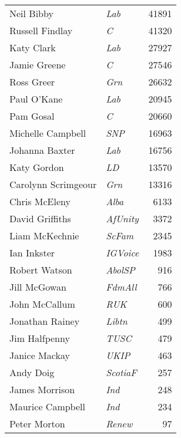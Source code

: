 {\footnotesize
\begin{tabular*}{\columnwidth}{@{\extracolsep{\fill}} p{} >{\itshape}l r @{\extracolsep{\fill}}}
	Neil Bibby & Lab & 41891\\%
	Russell Findlay & C & 41320\\%
	Katy Clark & Lab & 27927\\%
	Jamie Greene & C & 27546\\%
	Ross Greer & Grn & 26632\\%
	Paul O'Kane & Lab & 20945\\%
	Pam Gosal & C & 20660\\%
	\hline
	Michelle Campbell & SNP & 16963\\
	Johanna Baxter & Lab & 16756\\
	Katy Gordon & LD & 13570\\
	Carolynn Scrimgeour & Grn & 13316\\
	Chris McEleny & Alba & 6133\\
	David Griffiths & AfUnity & 3372\\
	Liam McKechnie & ScFam & 2345\\
	Ian Inkster & IGVoice & 1983\\
	Robert Watson & AbolSP & 916\\
	Jill McGowan & FdmAll & 766\\
	John McCallum & RUK & 600\\
	Jonathan Rainey & Libtn & 499\\
	Jim Halfpenny & TUSC & 479\\
	Janice Mackay & UKIP & 463\\
	Andy Doig & ScotiaF & 257\\
	James Morrison & Ind & 248\\
	Maurice Campbell & Ind & 234\\
	Peter Morton & Renew & 97\\
\end{tabular*}

}

